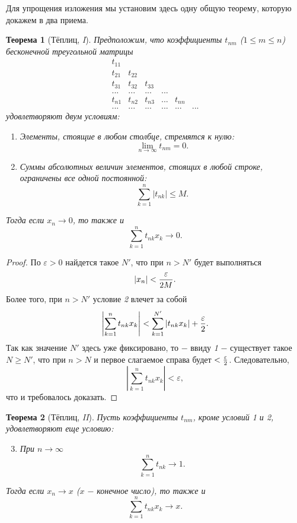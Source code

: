 \documentclass{article}
\newtheorem{theorem}{Теорема}[section]
\begin{document}
Для упрощения изложения мы установим здесь одну общую теорему, которую докажем в два приема.

\begin{theorem}[Тёплиц, \textit{I}]
Предположим, что коэффициенты \(t_{nm}\) (\(1 \leq m \leq n\)) бесконечной треугольной матрицы
\[
\begin{matrix}
t_{11} \\
t_{21} & t_{22} \\
t_{31} & t_{32} & t_{33} \\
... & ... & ... & ... \\
t_{n1} & t_{n2} & t_{n3} & ... & t_{nn} \\
... & ... & ... & ... & ... & ...
\end{matrix}
\]
удовлетворяют двум условиям:

\begin{enumerate}
\item Элементы, стоящие в любом столбце, стремятся к нулю:
\[
\lim\limits_{n \to \infty} t_{nm} = 0.
\]
\item Суммы абсолютных величин элементов, стоящих в любой строке, ограничены все одной постоянной:
\[
\sum\limits_{k = 1}^{n} {|t_{nk}|} \leq M.
\]
\end{enumerate}
Тогда если \(x_n \to 0\), то также и
\[
\sum\limits_{k = 1}^{n} {t_{nk} x_k} \to 0.
\]
\end{theorem}

\begin{proof}
По \(\varepsilon > 0\) найдется такое \(N'\), что при \(n > N'\) будет выполняться
\[
|x_n| < {{\varepsilon} \over {2M}}.
\]
Более того, при \(n > N'\) условие \textit{2} влечет за собой
\[
\left|\sum\limits_{k = 1}^{n} {t_{nk} x_k}\right| < \sum\limits_{k = 1}^{N'} {|t_{nk} x_k|} + {{\varepsilon} \over {2}}.
\]
Так как значение \(N'\) здесь уже фиксировано, то \(-\) ввиду \textit{1} \(-\) существует такое \(N \geq N'\), что при \(n > N\) и первое слагаемое справа будет \(< {\varepsilon \over 2}\). Следовательно,
\[
\left|\sum\limits_{k = 1}^{n} {t_{nk} x_k}\right| < \varepsilon,
\]
что и требовалось доказать.
\end{proof}

\begin{theorem}[Тёплиц, \textit{II}]
Пусть коэффициенты \(t_{nm}\), кроме условий \textit{1} и \textit{2}, удовлетворяют еще условию:
\begin{enumerate}
\setcounter{enumi}{2}
\item При \(n \to \infty\)
\[
\sum\limits_{k = 1}^{n} {t_{nk}} \to 1.
\]
\end{enumerate}
Тогда если \(x_n \to x\) (\(x\) \(-\) конечное число), то также и
\[
\sum\limits_{k = 1}^{n} {t_{nk} x_k} \to x.
\]
\end{theorem}
\end{document}
